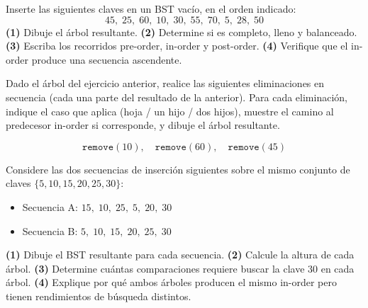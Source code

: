 \begin{ejercicio}
Inserte las siguientes claves en un BST vacío, en el orden indicado:
\[
    45,\; 25,\; 60,\; 10,\; 30,\; 55,\; 70,\; 5,\; 28,\; 50
\]
\textbf{(1)} Dibuje el árbol resultante. \textbf{(2)} Determine si es completo, lleno
y balanceado. \textbf{(3)} Escriba los recorridos pre-order, in-order y post-order.
\textbf{(4)} Verifique que el in-order produce una secuencia ascendente.
\end{ejercicio}

\begin{ejercicio}
Dado el árbol del ejercicio anterior, realice las siguientes eliminaciones en secuencia
(cada una parte del resultado de la anterior). Para cada eliminación, indique el caso
que aplica (hoja / un hijo / dos hijos), muestre el camino al predecesor in-order si
corresponde, y dibuje el árbol resultante.

\[
    \texttt{remove}(10), \quad \texttt{remove}(60), \quad \texttt{remove}(45)
\]
\end{ejercicio}

\begin{ejercicio}
Considere las dos secuencias de inserción siguientes sobre el mismo conjunto de claves
$\{5, 10, 15, 20, 25, 30\}$:
\begin{itemize}
    \item Secuencia A: $15,\; 10,\; 25,\; 5,\; 20,\; 30$
    \item Secuencia B: $5,\; 10,\; 15,\; 20,\; 25,\; 30$
\end{itemize}
\textbf{(1)} Dibuje el BST resultante para cada secuencia. \textbf{(2)} Calcule la
altura de cada árbol. \textbf{(3)} Determine cuántas comparaciones requiere buscar la
clave $30$ en cada árbol. \textbf{(4)} Explique por qué ambos árboles producen el mismo
in-order pero tienen rendimientos de búsqueda distintos.
\end{ejercicio}


\printbibliography[heading=subbibliography]

